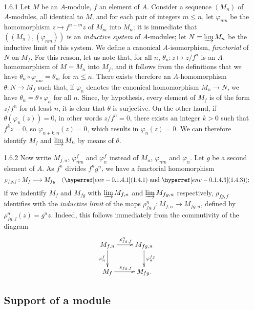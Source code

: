 \documentclass{book}
\begin{document}
\begin{env}{1.6.1}
\label{env-0.1.6.1}
Let $M$ be an $A$-module, $f$ an element of $A$. Consider a sequence
$(M_n)$ of $A$-modules, all identical to $M$, and for each pair of integers
$m\leq n$, let $\varphi_{nm}$ be the homomorphism $z\mapsto f^{n-m}z$ of $M_m$
into $M_n$; it is immediate that $((M_n),(\varphi_{nm}))$ is an \emph{inductive system}
of $A$-modules; let $N=\varinjlim M_n$ be the inductive limit of this system. We define
a canonical $A$-isomorphism, \emph{functorial} of $N$ on $M_f$. For this reason, let us
note that, for all $n$, $\theta_n\colon z\mapsto z/f^n$ is an $A$-homomorphism of $M=M_n$ into
$M_f$, and it follows from the definitions that we have $\theta_n\circ\varphi_{nm}=\theta_m$
for $m\leq n$. There exists therefore an $A$-homomorphism $\theta\colon N\to M_f$ such that, if
$\varphi_n$ denotes the canonical homomorphism $M_n\to N$, we have $\theta_n=\theta\circ\varphi_n$
for all $n$. Since, by hypothesis, every element of $M_f$ is of the form $z/f^n$ for at least $n$,
it is clear that $\theta$ is surjective. On the other hand, if $\theta(\varphi_n(z))=0$,
in other words $z/f^n=0$, there exists an integer $k>0$ such that $f^k z=0$, so $\varphi_{n+k,n}(z)=0$,
which results in $\varphi_n(z)=0$. We can therefore identify $M_f$ and $\varinjlim M_n$ by means
of $\theta$.
\end{env}

\begin{env}{1.6.2}
\label{env-0.1.6.2}
Now write $M_{f,n}$, $\varphi_{nm}^f$ and $\varphi_n^f$ instead of $M_n$, $\varphi_{nm}$ and
$\varphi_n$. Let $g$ be a second element of $A$. As $f^n$ divides $f^n g^n$, we have a functorial
homomorphism
\[
  \rho_{fg,f}\colon M_f\longrightarrow M_{fg}\quad(\eref{1.4.1}\text{ and }\eref{1.4.3});
\]
if we indentify $M_f$ and $M_{fg}$ with $\varinjlim M_{f,n}$ and $\varinjlim M_{fg,n}$
respectively, $\rho_{fg,f}$ identifies with the \emph{inductive limit} of the maps
$\rho_{fg,f}^n\colon M_{f,n}\to M_{fg,n}$, defined by $\rho_{fg,f}^n(z)=g^n z$. Indeed, this follows
immediately from the commutivity of the diagram
\[
  \xymatrix{
    M_{f,n}\ar[r]^{\rho_{fg,f}^n}\ar[d]_{\varphi_n^f} & M_{fg,n}\ar[d]^{\varphi_n^{fg}}\\
    M_f\ar[r]^{\rho_{fg,f}} & M_{fg}.
  }
\]
\end{env}

\subsection{Support of a module}
\label{0-prelim-1.7}
\end{document}

